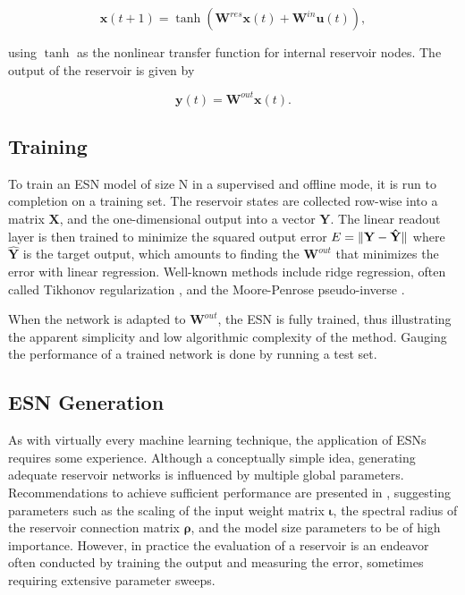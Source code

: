 \begin{equation}
  \mathbf{x}(t + 1) =
    \tanh(\mathbf{W}^{res}\mathbf{x}(t)
        + \mathbf{W}^{in}\mathbf{u}(t)),
  \label{xt}
\end{equation}

\noindent using $\tanh$ as the nonlinear transfer function for internal
reservoir nodes. The output of the reservoir is given by

\begin{equation}
  \mathbf{y}(t) =
    \mathbf{W}^{out}\mathbf{x}(t).
  \label{yt}
\end{equation}

\subsection{Training}

To train an ESN model of size N in a supervised and offline mode, it is run to
completion on a training set. The reservoir states are collected row-wise into a
matrix $\mathbf{X}$, and the one-dimensional output into a vector
$\mathbf{Y}$. The linear readout layer is then trained to minimize the squared
output error $E = \Vert \mathbf{Y} - \mathbf{\hat{Y}} \Vert$ where $\mathbf{\hat{Y}}$
is the target output, which amounts to finding the $\mathbf{W}^{out}$ that
minimizes the error with linear regression. Well-known methods include ridge
regression, often called Tikhonov regularization \cite{tikhonov_solutions_1977},
and the Moore-Penrose pseudo-inverse \cite{penrose_generalized_1955}.

When the network is adapted to $\mathbf{W}^{out}$, the ESN is fully trained,
thus illustrating the apparent simplicity and low algorithmic complexity of the
method. Gauging the performance of a trained network is done by running a test
set.

\subsection{ESN Generation}

As with virtually every machine learning technique, the application of ESNs
requires some experience. Although a conceptually simple idea, generating
adequate reservoir networks is influenced by multiple global
parameters. Recommendations to achieve sufficient performance are presented in
\cite{montavon_practical_2012, jaeger_tutorial_2002}, suggesting parameters such
as the scaling of the input weight matrix $\boldsymbol{\iota}$, the spectral
radius of the reservoir connection matrix $\boldsymbol{\rho}$, and the model
size parameters to be of high importance. However, in practice the evaluation of
a reservoir is an endeavor often conducted by training the output and measuring
the error, sometimes requiring extensive parameter sweeps.

